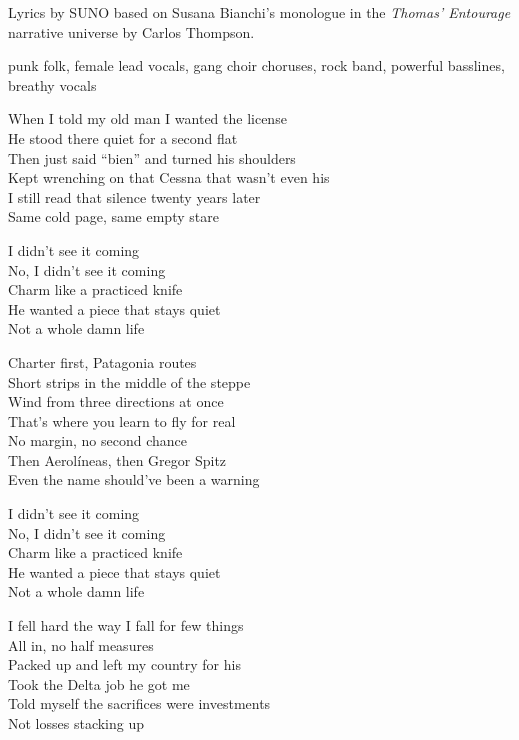 
\begin{notes}
Lyrics by SUNO based on Susana Bianchi's monologue in the \emph{Thomas’ Entourage} narrative universe by Carlos Thompson.
\end{notes}
\begin{style}
punk folk, female lead vocals, gang choir choruses, rock band, powerful basslines, breathy vocals
\end{style}
\begin{lyrics}
When I told my old man I wanted the license\\
He stood there quiet for a second flat\\
Then just said “bien” and turned his shoulders\\
Kept wrenching on that Cessna that wasn’t even his\\
I still read that silence twenty years later\\
Same cold page, same empty stare

I didn’t see it coming\\
No, I didn’t see it coming\\
Charm like a practiced knife\\
He wanted a piece that stays quiet\\
Not a whole damn life

Charter first, Patagonia routes\\
Short strips in the middle of the steppe\\
Wind from three directions at once\\
That’s where you learn to fly for real\\
No margin, no second chance\\
Then Aerolíneas, then Gregor Spitz\\
Even the name should’ve been a warning

I didn’t see it coming\\
No, I didn’t see it coming\\
Charm like a practiced knife\\
He wanted a piece that stays quiet\\
Not a whole damn life

I fell hard the way I fall for few things\\
All in, no half measures\\
Packed up and left my country for his\\
Took the Delta job he got me\\
Told myself the sacrifices were investments\\
Not losses stacking up


\end{lyrics}
